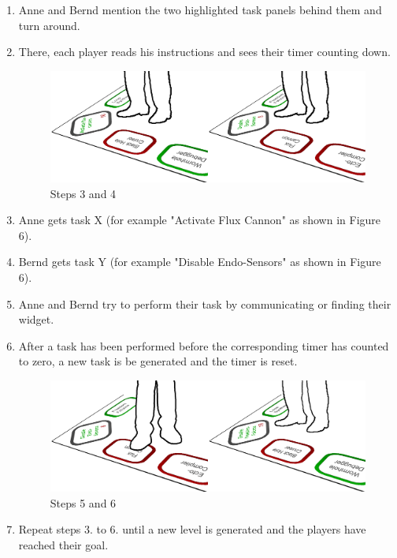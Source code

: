 \documentclass{sigchi}
\begin{document}
\begin{enumerate}
\item Anne and Bernd mention the two highlighted task panels behind them and turn around.
\item There, each player reads his instructions and sees their timer counting down.


\begin{figure}[H]
\centering
\includegraphics[width=0.99\columnwidth]{walkthrough/klein/gamingarea3+4}
\caption{Steps 3 and 4}
\label{fig:gamingArea}
\end{figure}

\item Anne gets task X (for example "Activate Flux Cannon" as shown in Figure 6).
\item Bernd gets task Y (for example "Disable Endo-Sensors" as shown in Figure 6).
\item Anne and Bernd try to perform their task by communicating or finding their widget.
\item After a task has been performed before the corresponding timer has counted to zero, a new task is be generated and the timer is reset.

\begin{figure}[H]
\centering
\includegraphics[width=0.99\columnwidth]{walkthrough/klein/gamingarea5+6}
\caption{Steps 5 and 6}
\label{fig:gamingArea}
\end{figure}
\item Repeat steps 3. to 6. until a new level is generated and the players have reached their goal.
\end{enumerate}
\end{document}
